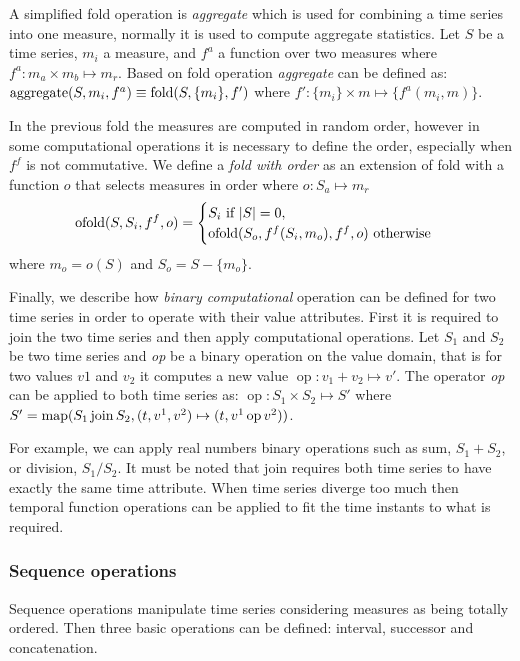 A simplified fold operation is \emph{aggregate} which is used for
combining a time series into one measure, normally it is used to
compute aggregate statistics.  Let $S$ be a time series, $m_i$ a
measure, and $f^a$ a function over two measures where $f^a: m_a \times
m_b \mapsto m_r$.  Based on fold operation \emph{aggregate} can be
defined as: $\operatorname*{aggregate}(S,m_i,f^a) \equiv \operatorname*{fold}(S,\{m_i\},f')$ where $f':
\{m_i\} \times m \mapsto \{f^a(m_i,m)\}$.

In the previous fold the measures are computed in random order,
however in some computational operations it is necessary to define the
order, especially when $f^f$ is not commutative. We define a
\emph{fold with order} as an extension of fold with a function $o$
that selects measures in order where $o: S_a \mapsto m_r$
\[
 \operatorname*{ofold}(S,S_i,f^f,o) =
  \begin{cases}
    S_i  \text{ if } |S|=0, \\
    \operatorname*{ofold}(S_o,f^f(S_i,m_o),f^f,o)  \text{ otherwise}
  \end{cases}
\]
where $m_o = o(S)$ and $S_o = S - \{m_o\}$.


Finally, we describe how \emph{binary computational} operation can be
defined for two time series in order to operate with their value
attributes.  First it is required to join the two time series and then
apply computational operations. Let $S_1$ and $S_2$ be two time series
and \emph{op} be a binary operation on the value domain, that is for
two values $v1$ and $v_2$ it computes a new value $\operatorname{op}:
v_1 + v_2 \mapsto v'$. The operator \emph{op} can be applied to both
time series as: $\operatorname{op}: S_1 \times S_2 \mapsto S'$ where
$S' = \operatorname*{map}(S_1 \operatorname*{join} S_2, (t,v^1,v^2)\mapsto(t,v^1 \operatorname{op}
v^2))$.

For example, we can apply real numbers binary operations such as sum,
$S_1 + S_2$, or division, $S_1 / S_2$. It must be noted that join
requires both time series to have exactly the same time
attribute. When time series diverge too much then temporal function
operations can be applied to fit the time instants to what is
required.





\subsubsection{Sequence operations}

Sequence operations manipulate time series considering measures as
being totally ordered. Then three basic operations can be defined:
interval, successor and concatenation.


